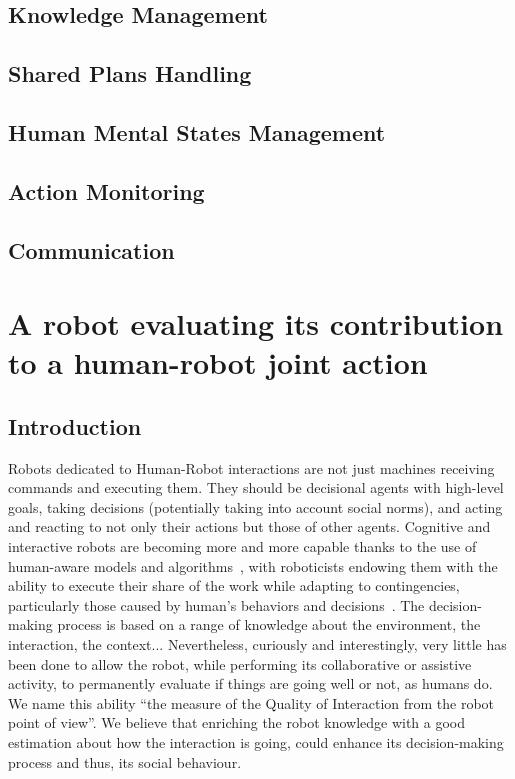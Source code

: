 \documentclass[a4paper,11pt,twoside]{StyleThese}
\begin{document}
\subsection{Knowledge Management}

\subsection{Shared Plans Handling}

\subsection{Human Mental States Management}

\subsection{Action Monitoring}



\subsection{Communication}

\section{A robot evaluating its contribution to a human-robot joint action}\label{sec:qoi}

\subsection{Introduction}

Robots dedicated to Human-Robot interactions are not just machines receiving commands and executing them. They should be decisional agents with high-level goals, taking decisions (potentially taking into account social norms), and acting and reacting to not only their actions but those of other agents. Cognitive and interactive robots are becoming more and more capable thanks to the use of human-aware models and algorithms~\cite{kruse2013,thomaz_2016_computational}, with roboticists endowing them with the ability to execute their share of the work while adapting to contingencies, particularly those caused by human's behaviors and decisions~\cite{hoffman_2007_fluency,cakmak_2017,lemaignan_2017_artificial}. The decision-making process is based on a range of knowledge about the environment, the interaction, the context... Nevertheless, curiously and interestingly, very little has been done to allow the robot, while performing its collaborative or assistive activity, to permanently evaluate if things are going well or not, as humans do. We name this ability ``the measure of the Quality of Interaction from the robot point of view''. We believe that enriching the robot knowledge with a good estimation about how the interaction is going, could enhance its decision-making process and thus, its social behaviour.
\end{document}
